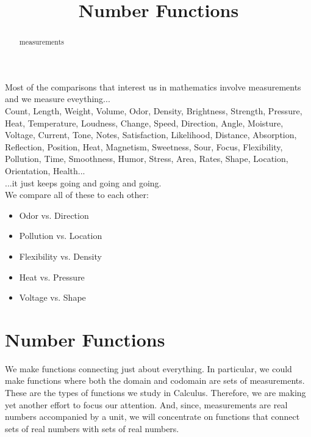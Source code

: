 \documentclass{ximera}
\title{Number Functions}
\begin{document}
\begin{abstract}
measurements
\end{abstract}
\maketitle





Most of the comparisons that interest us in mathematics involve measurements and we measure eveything...\\


Count, Length, Weight, Volume, Odor, Density, Brightness, Strength, Pressure, Heat, Temperature, Loudness, Change, Speed, Direction, Angle, Moisture, Voltage, Current, Tone, Notes, Satisfaction, Likelihood, Distance, Absorption, Reflection, Position, Heat, Magnetism, Sweetness, Sour, Focus, Flexibility, Pollution, Time, Smoothness, Humor, Stress, Area, Rates, Shape, Location, Orientation, Health... \\



...it just keeps going and going and going. \\


We compare all of these to each other:



\begin{itemize}
\item Odor vs. Direction
\item Pollution vs. Location
\item Flexibility vs. Density
\item Heat vs. Pressure
\item Voltage vs. Shape 
\end{itemize}







\section{Number Functions}

We make functions connecting just about everything.  In particular, we could make functions where both the domain and codomain are sets of measurements. These are the types of functions we study in Calculus.  Therefore, we are making yet another effort to focus our attention.  And, since, measurements are real numbers accompanied by a unit, we will concentrate on functions that connect sets of real numbers with sets of real numbers. \\
\end{document}
